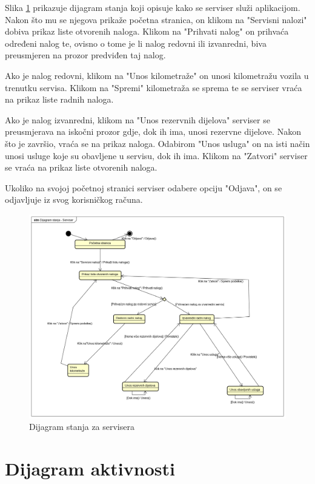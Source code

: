 			Slika \ref{fig:statediagram} prikazuje dijagram stanja koji opisuje kako se serviser služi aplikacijom. Nakon što mu se njegova prikaže početna stranica, on klikom na "Servisni nalozi" dobiva prikaz liste otvorenih naloga. Klikom na "Prihvati nalog" on prihvaća određeni nalog te, ovisno o tome je li nalog redovni ili izvanredni, biva preusmjeren na prozor predviđen taj nalog.
			
			Ako je nalog redovni, klikom na "Unos kilometraže" on unosi kilometražu vozila u trenutku servisa. Klikom na "Spremi" kilometraža se sprema te se serviser vraća na prikaz liste radnih naloga.
			
			Ako je nalog izvanredni, klikom na "Unos rezervnih dijelova" serviser se preusmjerava na iskočni prozor gdje, dok ih ima, unosi rezervne dijelove. Nakon što je završio, vraća se na prikaz naloga. Odabirom "Unos usluga" on na isti način unosi usluge koje su obavljene u servisu, dok ih ima. Klikom na "Zatvori" serviser se vraća na prikaz liste otvorenih naloga.
			
			Ukoliko na svojoj početnoj stranici serviser odabere opciju "Odjava", on se odjavljuje iz svog korisničkog računa.
			
			\begin{figure}[H]
				\centering
				\includegraphics[width=1.0\linewidth]{dijagrami/state_diag_serviser}
				\caption{Dijagram stanja za servisera}
				\label{fig:statediagram}
			\end{figure}
			
			\eject 
		
		\section{Dijagram aktivnosti}
			
